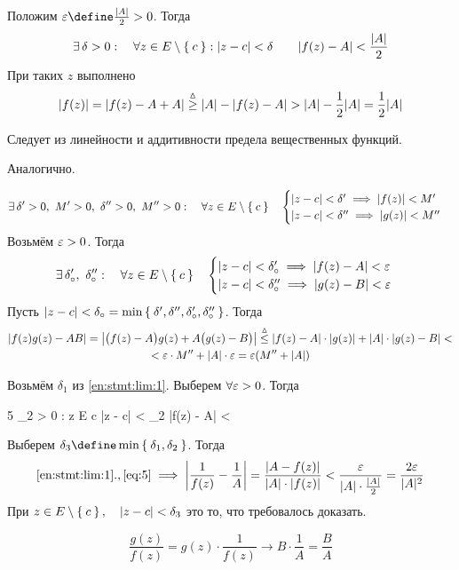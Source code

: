 \begin{eproof}
	\item Положим $ \veps \define \frac{|A|}2 > 0 $. Тогда
	$$ \exists\, \delta > 0 : \quad \forall z \in E \setminus \Set c : |z - c| < \delta \qquad |f(z) - A| < \frac{|A|}2 $$
	При таких $ z $ выполнено
	$$ |f(z)| = |f(z) - A + A| \stackrel\vartriangle\ge |A| - |f(z) - A| > |A| - \frac12 |A| = \frac12 |A| $$

	\item Следует из линейности и аддитивности предела вещественных функций.

	\item Аналогично.

	\item
	$$ \exists\, \delta' > 0, ~ M' > 0, ~ \delta'' > 0, ~ M'' > 0 : \quad \forall z \in E \setminus \Set c \quad
	\begin{cases}
		|z - c| < \delta' \implies |f(z)| < M' \\
		|z - c| < \delta'' \implies |g(z)| < M''
	\end{cases} $$
	Возьмём $ \varepsilon > 0 $. Тогда
	$$ \exists\, \delta_\circ', ~ \delta_\circ'' : \quad \forall z \in E \setminus \Set c \quad
	\begin{cases}
		|z - c| < \delta_\circ' \implies |f(z) - A| < \varepsilon \\
		|z - c| < \delta_\circ'' \implies |g(z) - B| < \varepsilon
	\end{cases} $$
	Пусть $ |z - c| < \delta_\circ = \min\Set{\delta', \delta'', \delta_\circ', \delta_\circ''} $. Тогда
	\begin{multline*}
		|f(z)g(z) - AB| = \big| \big( f(z) - A \big)g(z) + A \big( g(z) - B \big) \big| \stackrel\vartriangle\le |f(z) - A| \cdot |g(z)| + |A| \cdot |g(z) - B| < \\
		< \varepsilon \cdot M'' + |A| \cdot \varepsilon = \varepsilon(M'' + |A|)
	\end{multline*}

	\item Возьмём $ \delta_1 $ из \ref{en:stmt:lim:1}. Выберем $ \forall \varepsilon > 0 $. Тогда
	\begin{equ}5
		\exist \delta_2 > 0 : \quad \forall z \in E \setminus \set c \quad |z - c| < \delta_2 \implies |f(z) - A| < \veps
	\end{equ}
	Выберем $ \delta_3 \define \min\set{\delta_1, \delta_2} $. Тогда
	$$ \ref{en:stmt:lim:1}., \eref5 \implies \bigg| \frac1{f(z)} - \frac1A \bigg| = \frac{|A - f(z)|}{|A| \cdot |f(z)|} < \frac\veps{|A| \cdot \frac{|A|}2} = \frac{2\veps}{|A|^2} $$
	При $ z \in E \setminus \Set c, \quad |z - c| < \delta_3 $ это то, что требовалось доказать.

	\item
	$$ \frac{g(z)}{f(z)} = g(z) \cdot \frac1{f(z)} \to B \cdot \frac1A = \frac BA $$
\end{eproof}
